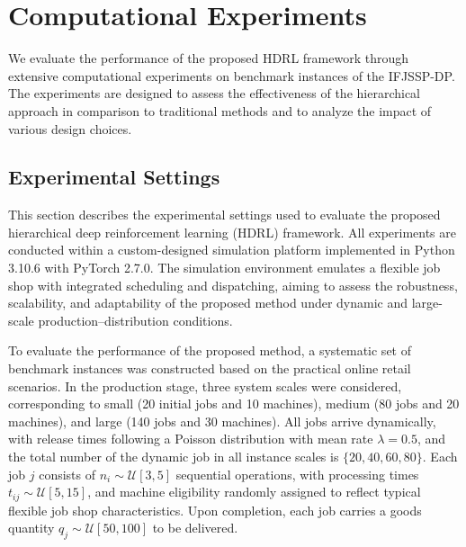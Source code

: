\documentclass{article}
\begin{document}
\section{Computational Experiments}
We evaluate the performance of the proposed HDRL framework through extensive computational experiments on benchmark instances of the IFJSSP-DP. The experiments are designed to assess the effectiveness of the hierarchical approach in comparison to traditional methods and to analyze the impact of various design choices.

\subsection{Experimental Settings}

This section describes the experimental settings used to evaluate the proposed hierarchical deep reinforcement learning (HDRL) framework. All experiments are conducted within a custom-designed simulation platform implemented in Python 3.10.6 with PyTorch 2.7.0. The simulation environment emulates a flexible job shop with integrated scheduling and dispatching, aiming to assess the robustness, scalability, and adaptability of the proposed method under dynamic and large-scale production–distribution conditions.

To evaluate the performance of the proposed method, a systematic set of benchmark instances was constructed based on the practical online retail scenarios. In the production stage, three system scales were considered, corresponding to small (20 initial jobs and 10 machines), medium (80 jobs and 20 machines), and large (140 jobs and 30 machines). All jobs arrive dynamically, with release times following a Poisson distribution with mean rate $\lambda=0.5$, and the total number of the dynamic job in all instance scales is $\{20, 40, 60, 80\}$. Each job $j$ consists of $n_i \sim \mathcal{U}[3,5]$ sequential operations, with processing times $t_{ij} \sim \mathcal{U}[5,15]$, and machine eligibility randomly assigned to reflect typical flexible job shop characteristics. Upon completion, each job carries a goods quantity $q_j \sim \mathcal{U}[50,100]$ to be delivered.
\end{document}
